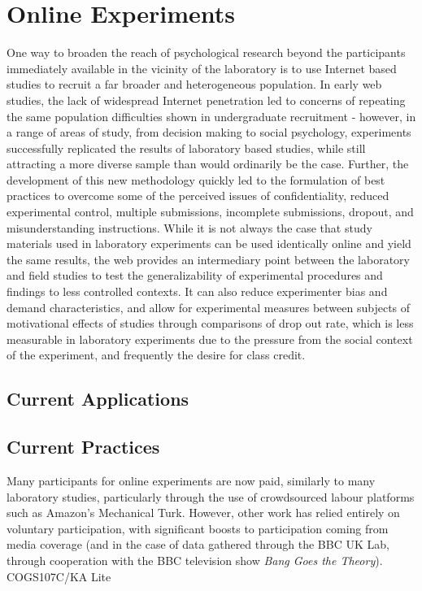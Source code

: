 \documentclass[12pt,a4paper,titlepage]{scrreprt}
\begin{document}
\section{Online Experiments}
One way to broaden the reach of psychological research beyond the participants immediately available in the vicinity of the laboratory is to use Internet based studies to recruit a far broader and heterogeneous population. In early web studies, the lack of widespread Internet penetration led to concerns of repeating the same population difficulties shown in undergraduate recruitment - however, in a range of areas of study, from decision making to social psychology, experiments successfully replicated the results of laboratory based studies, while still attracting a more diverse sample than would ordinarily be the case\cite{krantz_comparing_1997}\cite{buchanan_using_1999}\cite{birnbaum_decision_2000}\cite{mcgraw_integrity_2000}\cite{gosling_should_2004}\cite{ritter_internet_2004}. Further, the development of this new methodology quickly led to the formulation of best practices to overcome some of the perceived issues of confidentiality, reduced experimental control, multiple submissions, incomplete submissions, dropout, and misunderstanding instructions\cite{reips_web_2000}\cite{reips_standards_2002}\cite{birnbaum_human_2004}. While it is not always the case that study materials used in laboratory experiments can be used identically online and yield the same results\cite{buchanan_nonequivalence_2005}, the web provides an intermediary point between the laboratory and field studies to test the generalizability of experimental procedures and findings to less controlled contexts. It can also reduce experimenter bias and demand characteristics, and allow for experimental measures between subjects of motivational effects of studies through comparisons of drop out rate\cite{reips_web_2000}, which is less measurable in laboratory experiments due to the pressure from the social context of the experiment, and frequently the desire for class credit.
\subsection{Current Applications}
\subsection{Current Practices}
Many participants for online experiments are now paid, similarly to many laboratory studies, particularly through the use of crowdsourced labour platforms such as Amazon's Mechanical Turk\cite{buhrmester_amazons_2011}\cite{rand_promise_2012}\cite{crump_evaluating_2013}. However, other work has relied entirely on voluntary participation, with significant boosts to participation coming from media coverage (and in the case of data gathered through the BBC UK Lab, through cooperation with the BBC television show \textit{Bang Goes the Theory})\cite{owen_putting_2010}\cite{germine_is_2012}\cite{halberda_number_2012}.
COGS107C/KA Lite
\end{document}
